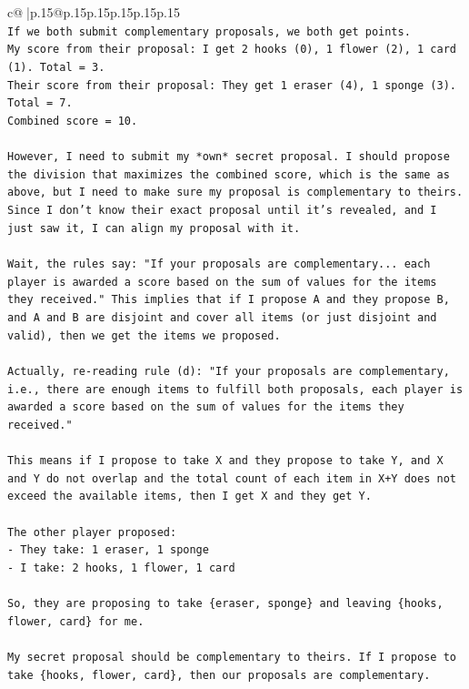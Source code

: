 \documentclass{article}
\begin{document}
{\begin{supertabular}{c@{$\;$}|p{.15\linewidth}@{}p{.15\linewidth}p{.15\linewidth}p{.15\linewidth}p{.15\linewidth}p{.15\linewidth}}
{{{\\ 
\texttt{If we both submit complementary proposals, we both get points.} \\
\texttt{My score from their proposal: I get 2 hooks (0), 1 flower (2), 1 card (1). Total = 3.} \\
\texttt{Their score from their proposal: They get 1 eraser (4), 1 sponge (3). Total = 7.} \\
\texttt{Combined score = 10.} \\
\\ 
\texttt{However, I need to submit my *own* secret proposal. I should propose the division that maximizes the combined score, which is the same as above, but I need to make sure my proposal is complementary to theirs. Since I don't know their exact proposal until it's revealed, and I just saw it, I can align my proposal with it.} \\
\\ 
\texttt{Wait, the rules say: "If your proposals are complementary... each player is awarded a score based on the sum of values for the items they received." This implies that if I propose A and they propose B, and A and B are disjoint and cover all items (or just disjoint and valid), then we get the items we proposed.} \\
\\ 
\texttt{Actually, re{-}reading rule (d): "If your proposals are complementary, i.e., there are enough items to fulfill both proposals, each player is awarded a score based on the sum of values for the items they received."} \\
\\ 
\texttt{This means if I propose to take X and they propose to take Y, and X and Y do not overlap and the total count of each item in X+Y does not exceed the available items, then I get X and they get Y.} \\
\\ 
\texttt{The other player proposed:} \\
\texttt{{-} They take: 1 eraser, 1 sponge} \\
\texttt{{-} I take: 2 hooks, 1 flower, 1 card} \\
\\ 
\texttt{So, they are proposing to take \{eraser, sponge\} and leaving \{hooks, flower, card\} for me.} \\
\\ 
\texttt{My secret proposal should be complementary to theirs. If I propose to take \{hooks, flower, card\}, then our proposals are complementary.} \\
}}}
\end{supertabular}}
\end{document}
